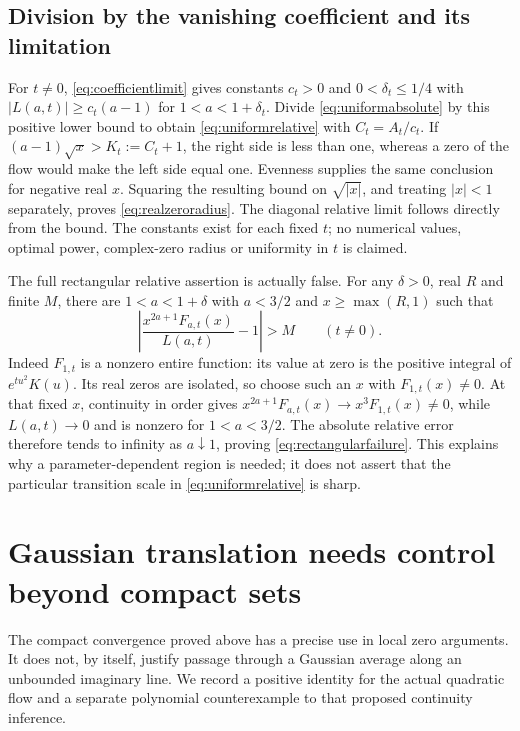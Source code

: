 \documentclass[11pt]{article}
\theoremstyle{remark}\newtheorem{remark}[theorem]{Remark}
\begin{document}
\subsection*{Division by the vanishing coefficient and its limitation}
For $t\ne0$, \eqref{eq:coefficientlimit} gives constants
$c_t>0$ and $0<\delta_t\leq1/4$ with
$|L(a,t)|\geq c_t(a-1)$ for $1<a<1+\delta_t$.
Divide \eqref{eq:uniformabsolute} by this positive lower bound to
obtain \eqref{eq:uniformrelative} with $C_t=A_t/c_t$.
If $(a-1)\sqrt{x}>K_t:=C_t+1$, the right side is less than one,
whereas a zero of the flow would make the left side equal one.
Evenness supplies the same conclusion for negative real $x$.
Squaring the resulting bound on $\sqrt{|x|}$, and treating
$|x|<1$ separately, proves \eqref{eq:realzeroradius}.
The diagonal relative limit follows directly from the bound.
The constants exist for each fixed $t$; no numerical values,
optimal power, complex-zero radius or uniformity in $t$ is claimed.

The full rectangular relative assertion is actually false. For any
$\delta>0$, real $R$ and finite $M$, there are $1<a<1+\delta$
with $a<3/2$ and $x\geq\max(R,1)$ such that
\begin{equation}\label{eq:rectangularfailure}
 \left|\frac{x^{2a+1}F_{a,t}(x)}{L(a,t)}-1\right|>M
                       \qquad(t\ne0).
\end{equation}
Indeed $F_{1,t}$ is a nonzero entire function: its value at zero
is the positive integral of $e^{tu^2}K(u)$. Its real zeros are
isolated, so choose such an $x$ with $F_{1,t}(x)\ne0$.
At that fixed $x$, continuity in order gives
$x^{2a+1}F_{a,t}(x)\to x^3F_{1,t}(x)\ne0$, while
$L(a,t)\to0$ and is nonzero for $1<a<3/2$. The absolute
relative error therefore tends to infinity as $a\downarrow1$,
proving \eqref{eq:rectangularfailure}. This explains why a
parameter-dependent region is needed; it does not assert that the
particular transition scale in \eqref{eq:uniformrelative} is sharp.

\section{Gaussian translation needs control beyond compact sets}
The compact convergence proved above has a precise use in local zero
arguments. It does not, by itself, justify passage through a Gaussian
average along an unbounded imaginary line. We record a positive identity
for the actual quadratic flow and a separate polynomial counterexample
to that proposed continuity inference.
\end{document}
